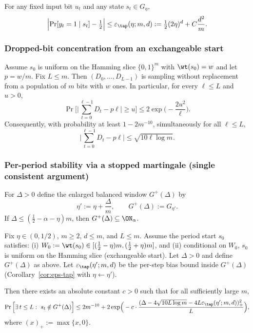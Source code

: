 \begin{corollary}
\label{cor:eps-tap}
For any fixed input bit \(u_t\) and any state \(s_t\in G_\eta\),
\[
\Bigl|\Pr[y_t=1\mid s_t]-\tfrac12\Bigr|
\le
\varepsilon_{\tap}(\eta;m,d)
:=
\tfrac12(2\eta)^d + C\frac{d^2}{m}.
\]
\end{corollary}

\subsubsection{Dropped-bit concentration from an exchangeable start}

\begin{lemma}
\label{lem:dropped-prefix-hypergeo}
Assume \(s_0\) is uniform on the Hamming slice \(\{0,1\}^m\) with \(\wt(s_0)=w\) and let \(p=w/m\).
Fix \(L\le m\). Then \((D_0,\dots,D_{L-1})\) is sampling without replacement from a population of \(m\) bits with \(w\) ones.
In particular, for every \(\ell\le L\) and \(u>0\),
\[
\Pr\Big[\Big|\sum_{t=0}^{\ell-1}D_t - p\ell\Big|\ge u\Big]
\le
2\exp\Big(-\frac{2u^2}{\ell}\Big).
\]
Consequently, with probability at least \(1-2m^{-10}\), simultaneously for all \(\ell\le L\),
\[
\Big|\sum_{t=0}^{\ell-1}D_t - p\ell\Big|
\le
\sqrt{10\ell\log m}.
\]
\end{lemma}

\subsubsection{Per-period stability via a stopped martingale (single consistent argument)}

For \(\Delta>0\) define the enlarged balanced window \(G^+(\Delta)\) by
\[
\eta':=\eta+\frac{\Delta}{m},
\qquad
G^+(\Delta):=G_{\eta'}.
\]
If \(\Delta\le (\tfrac12-\alpha-\eta)m\), then \(G^+(\Delta)\subseteq \ON_\alpha\).

\begin{lemma}
\label{lem:stability-clean}
Fix \(\eta\in(0,1/2)\), \(m\ge 2\), \(d\le m\), and \(L\le m\).
Assume the period start \(s_0\) satisfies:
(i) \(W_0:=\wt(s_0)\in[(\tfrac12-\eta)m,(\tfrac12+\eta)m]\), and
(ii) conditional on \(W_0\), \(s_0\) is uniform on the Hamming slice (exchangeable start).
Let \(\Delta>0\) and define \(G^+(\Delta)\) as above.
Let \(\varepsilon_{\tap}(\eta';m,d)\) be the per-step bias bound inside \(G^+(\Delta)\) (Corollary~\ref{cor:eps-tap} with \(\eta\leftarrow \eta'\)).

Then there exists an absolute constant \(c>0\) such that for all sufficiently large \(m\),
\begin{equation}
\label{eq:eps-stab}
\Pr\Big[\exists\,t\le L:\ s_t\notin G^+(\Delta)\Big]
\le
2m^{-10}
+
2\exp\!\Big(-c\cdot \frac{(\Delta - 4\sqrt{10L\log m} - 4L\varepsilon_{\tap}(\eta';m,d))_+^2}{L}\Big),
\end{equation}
where \((x)_+:=\max\{x,0\}\).
\end{lemma}

